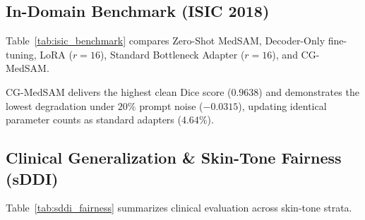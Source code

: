 \documentclass[runningheads]{llncs}
\begin{document}
\subsection{In-Domain Benchmark (ISIC 2018)}
Table~\ref{tab:isic_benchmark} compares Zero-Shot MedSAM, Decoder-Only fine-tuning, LoRA ($r=16$), Standard Bottleneck Adapter ($r=16$), and CG-MedSAM.

\begin{table}[h]
\centering
\caption{In-domain comparative benchmark on ISIC 2018 validation set ($N=519$).}
\label{tab:isic_benchmark}
\end{table}

CG-MedSAM delivers the highest clean Dice score ($0.9638$) and demonstrates the lowest degradation under $20\%$ prompt noise ($-0.0315$), updating identical parameter counts as standard adapters ($4.64\%$).

\subsection{Clinical Generalization \& Skin-Tone Fairness (sDDI)}
Table~\ref{tab:sddi_fairness} summarizes clinical evaluation across skin-tone strata.
\end{document}
